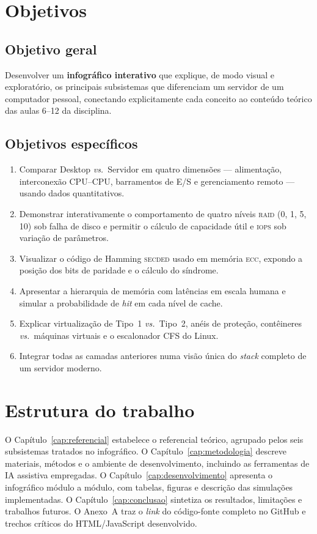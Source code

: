 \section{Objetivos}

\subsection{Objetivo geral}

Desenvolver um \textbf{infográfico interativo} que explique, de modo
visual e exploratório, os principais subsistemas que diferenciam um
servidor de um computador pessoal, conectando explicitamente cada
conceito ao conteúdo teórico das aulas 6--12 da disciplina.

\subsection{Objetivos específicos}

\begin{enumerate}
    \item Comparar Desktop \textit{vs.}\ Servidor em quatro dimensões
          --- alimentação, interconexão CPU--CPU, barramentos de E/S
          e gerenciamento remoto --- usando dados quantitativos.
    \item Demonstrar interativamente o comportamento de quatro
          níveis \textsc{raid} (0, 1, 5, 10) sob falha de disco e
          permitir o cálculo de capacidade útil e \textsc{iops} sob
          variação de parâmetros.
    \item Visualizar o código de Hamming \textsc{secded} usado
          em memória \textsc{ecc}, expondo a posição dos bits de
          paridade e o cálculo do síndrome.
    \item Apresentar a hierarquia de memória com latências em escala
          humana e simular a probabilidade de \textit{hit} em cada
          nível de cache.
    \item Explicar virtualização de Tipo~1 \textit{vs.}~Tipo~2,
          anéis de proteção, contêineres \textit{vs.}\ máquinas
          virtuais e o escalonador CFS do Linux.
    \item Integrar todas as camadas anteriores numa visão única do
          \textit{stack} completo de um servidor moderno.
\end{enumerate}

\section{Estrutura do trabalho}

O Capítulo~\ref{cap:referencial} estabelece o referencial teórico,
agrupado pelos seis subsistemas tratados no infográfico. O
Capítulo~\ref{cap:metodologia} descreve materiais, métodos e o
ambiente de desenvolvimento, incluindo as ferramentas de IA assistiva
empregadas. O Capítulo~\ref{cap:desenvolvimento} apresenta o
infográfico módulo a módulo, com tabelas, figuras e descrição das
simulações implementadas. O Capítulo~\ref{cap:conclusao} sintetiza os
resultados, limitações e trabalhos futuros. O Anexo~A traz o
\emph{link} do código-fonte completo no GitHub e trechos críticos do
HTML/JavaScript desenvolvido.
